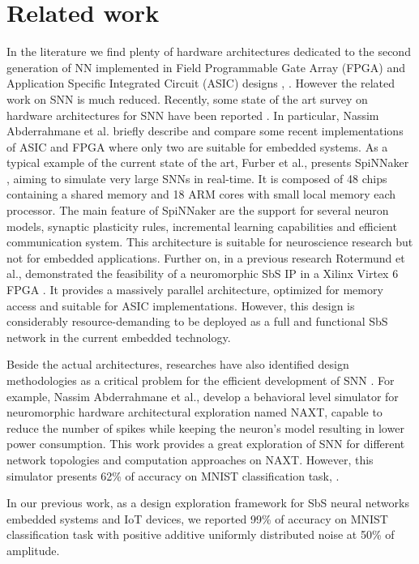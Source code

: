 \section{Related work}

In the literature we find plenty of hardware architectures dedicated to the second generation of NN implemented in Field Programmable Gate Array (FPGA) and Application Specific Integrated Circuit (ASIC) designs \cite{DSP_CNN}, \cite{Loihi_ASIC}. However the related work on SNN is much reduced. Recently, some state of the art survey on hardware architectures for SNN have been reported \cite{Design_Exploration_SbS_Trans20, SNN_Survey_Trans19}. In particular, Nassim Abderrahmane et al. briefly describe and compare some recent implementations of ASIC and FPGA where only two are suitable for embedded systems. As a typical example of the current state of the art, Furber et al., presents SpiNNaker \cite{Spinnaker_Trans13}, aiming to simulate very large SNNs in real-time. It is composed of 48 chips containing a shared memory and 18 ARM cores with small local memory each processor. The main feature of SpiNNaker are the support for several neuron models, synaptic plasticity rules, incremental learning capabilities and efficient communication system. This architecture is suitable for neuroscience research but not for embedded applications. Further on, in a previous research Rotermund et al., demonstrated the feasibility of a neuromorphic SbS IP in a Xilinx Virtex 6 FPGA \cite{rotermund2018massively}. It provides a massively parallel architecture, optimized for memory access and suitable for ASIC implementations. However, this design is considerably resource-demanding to be deployed as a full and functional SbS network in the current embedded technology.

Beside the actual architectures, researches have also identified design methodologies as a critical problem for the efficient development of SNN \cite{Design_Exploration_SbS_Trans20}. For example, Nassim Abderrahmane et al., develop a behavioral level simulator for neuromorphic hardware architectural exploration named NAXT, capable to reduce the number of spikes while keeping the neuron's model resulting in lower power consumption. This work provides a great exploration of SNN for different network topologies and computation approaches on NAXT. However, this simulator presents 62\% of accuracy on MNIST classification task, .

In our previous work\cite{nevarez2020accelerator}, as a design exploration framework for SbS neural networks embedded systems and IoT devices, we reported 99\% of accuracy on MNIST classification task with positive additive uniformly distributed noise at 50\% of amplitude.